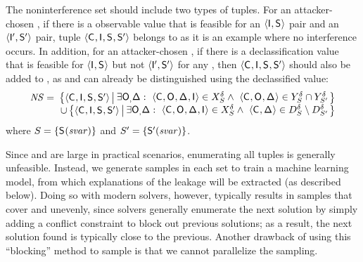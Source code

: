 The noninterference set \noninterferenceSet should include two types
of tuples. For an attacker-chosen \ACIFn{}, if there is a observable
value \AOOFn{} that is feasible for an $\langle \mathsf{I}_{},
\mathsf{S}_{}\rangle$ pair and an $\langle \mathsf{I}'_{}, \mathsf{S}'_{}\rangle$
pair, tuple $\langle\mathsf{C}_{}, \mathsf{I}_{}, \mathsf{S}_{}, \mathsf{S}'_{}\rangle$
belongs to \noninterferenceSet as it is an example where no
interference occurs.  In addition, for an attacker-chosen \ACIFn{},
if there is a declassification value \DCFn{} that is feasible for
$\langle \mathsf{I}_{}, \mathsf{S}_{}\rangle$ but not $\langle\mathsf{I}'_{},
\mathsf{S}'_{}\rangle$ for any \AIIFnAlt{}, then $\langle\mathsf{C}_{},
\mathsf{I}_{}, \mathsf{S}_{}, \mathsf{S}'_{}\rangle$ should also be added to
\noninterferenceSet, as \SecFn{} and \SecFnAlt{} can already be
distinguished using the declassified value:
\begin{align}
\begin{array}{@{}r@{\hspace{0.5em}}r@{}}
\noninterferenceSet =
&\left\{\langle\ACIFn{},\AIIFn{},\SecFn{},\SecFnAlt{}\rangle
\left| \begin{array}[m]{@{\hspace{0.2em}}r@{\hspace{0.25em}}r@{}} 
  \exists \AOOFn, \DCFn{}
  &:~\hfill \langle\ACIFn{}, \AOOFn{}, \DCFn{}, \AIIFn{}\rangle \in \possibleTriplesWithDeclass{\secretsSet{}}
   \wedge~\hfill
  \langle \ACIFn{},\AOOFn{},\DCFn{}\rangle \in \possibleDoubleWithDeclass{\secretsSet{}}\cap\possibleDoubleWithDeclass{\secretsSetAlt{}}
\end{array} 
\right.\right\}\\
& \cup \left\{\langle\ACIFn{},\AIIFn{},\SecFn{},\SecFnAlt{}\rangle
\left| \begin{array}[m]{@{\hspace{0.2em}}r@{\hspace{0.25em}}r@{}} 
  \exists \AOOFn,\DCFn{}
  &:~\hfill \langle \ACIFn{},\AOOFn{},\DCFn{},\AIIFn{}\rangle \in \possibleTriplesWithDeclass{\secretsSet{}}
  \wedge~\hfill
  \langle \ACIFn{},\DCFn{}\rangle \in \possibleDeclass{\secretsSet{}}\setminus \possibleDeclass{\secretsSetAlt{}}
\end{array} 
\right.\right\}
\end{array}
\label{eqn:noninterferenceSet}
\end{align}
where $S_{} = \{\mathsf{S}_{}(\mathit{svar})\}$ and $S_{}'
= \{\mathsf{S}'_{}(\mathit{svar})\}$.

Since \noninterferenceSet and \interferenceSet are large in
practical scenarios, enumerating all tuples is generally
unfeasible.  Instead, we generate samples in each set to train a
machine learning model, from which explanations of the leakage will be
extracted (as described below).  Doing so with modern \sat solvers,
however, typically results in samples that cover \noninterferenceSet
and \interferenceSet unevenly, since solvers generally enumerate
the next solution by simply adding a conflict constraint to block out
previous solutions; as a result, the next solution found is typically
close to the previous.  Another drawback of using this ``blocking''
method to sample is that we cannot parallelize the sampling.

